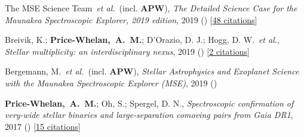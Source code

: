 \item[{\color{deemph}\scriptsize4}]The MSE Science Team~\textit{et al.}~(incl. \textbf{APW}), \textit{The Detailed Science Case for the Maunakea Spectroscopic Explorer, 2019 edition}, 2019 () [\href{http://adsabs.harvard.edu/abs/2019arXiv190404907T}{48 citations}]

\item[{\color{deemph}\scriptsize3}]Breivik, K.; \textbf{Price-Whelan,~A.~M.}; D'Orazio, D. J.; Hogg, D. W.~\textit{et al.}, \textit{Stellar multiplicity: an interdisciplinary nexus}, 2019 () [\href{http://adsabs.harvard.edu/abs/2019arXiv190305094B}{2 citations}]

\item[{\color{deemph}\scriptsize2}]Bergemann, M.~\textit{et al.}~(incl. \textbf{APW}), \textit{Stellar Astrophysics and Exoplanet Science with the Maunakea Spectroscopic Explorer (MSE)}, 2019 ()

\item[{\color{deemph}\scriptsize1}]\textbf{Price-Whelan,~A.~M.}; Oh, S.; Spergel, D. N., \textit{Spectroscopic confirmation of very-wide stellar binaries and large-separation comoving pairs from Gaia DR1}, 2017 () [\href{http://adsabs.harvard.edu/abs/2017arXiv170903532P}{15 citations}]
